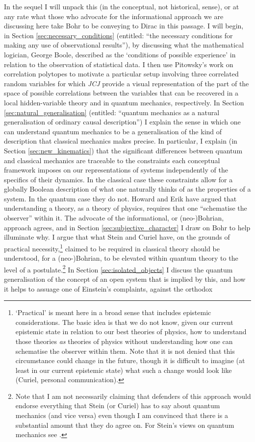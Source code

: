 \documentclass[12pt,english,twoside]{article}
\numberwithin{equation}{section}
\begin{document}
In the sequel I will unpack this (in the conceptual, not historical, sense), or at any rate what those who advocate for the informational approach we are discussing here take Bohr to be conveying to Dirac in this passage. I will begin, in Section \ref{sec:necessary_conditions} (entitled: ``the necessary conditions for making any use of observational results''), by discussing what the mathematical logician, George Boole, described as the `conditions of possible experience' in relation to the observation of statistical data. I then use Pitowsky's work on correlation polytopes to motivate a particular setup involving three correlated random variables for which \emph{JCJ} provide a visual representation of the part of the space of possible correlations between the variables that can be recovered in a local hidden-variable theory and in quantum mechanics, respectively. In Section \ref{sec:natural_generalisation} (entitled: ``quantum mechanics as a natural generalisation of ordinary causal description'') I explain the sense in which one can understand quantum mechanics to be a generalisation of the kind of description that classical mechanics makes precise. In particular, I explain (in Section \ref{sec:new_kinematics}) that the significant differences between quantum and classical mechanics are traceable to the constraints each conceptual framework imposes on our representations of systems independently of the specifics of their dynamics. In the classical case these constraints allow for a globally Boolean description of what one naturally thinks of as the properties of a system. In the quantum case they do not. Howard \citet[]{stein1994} and Erik \citet[]{curiel2020} have argued that understanding a theory, as a theory of physics, requires that one ``schematise the observer'' within it. The advocate of the informational, or (neo-)Bohrian, approach agrees, and in Section \ref{sec:subjective_character} I draw on Bohr to help illuminate why. I argue that what Stein and Curiel have, on the grounds of practical necessity,\footnote{\label{fn:necessity}`Practical' is meant here in a broad sense that includes epistemic considerations. The basic idea is that we do not know, given our current epistemic state in relation to our best theories of physics, how to understand those theories \emph{as} theories of physics without understanding how one can schematise the observer within them. Note that it is not denied that this circumstance could change in the future, though it is difficult to imagine (at least in our current epistemic state) what such a change would look like (Curiel, personal communication).} claimed to be required in classical theory should be understood, for a (neo-)Bohrian, to be elevated within quantum theory to the level of a postulate.\footnote{Note that I am not necessarily claiming that defenders of this approach would endorse everything that Stein (or Curiel) has to say about quantum mechanics (and vice versa) even though I am convinced that there is a substantial amount that they do agree on. For Stein's views on quantum mechanics see \citet[]{stein1972}.} In Section \ref{sec:isolated_objects} I discuss the quantum generalisation of the concept of an open system that is implied by this, and how it helps to assuage one of Einstein's complaints, against the orthodox 
\end{document}
